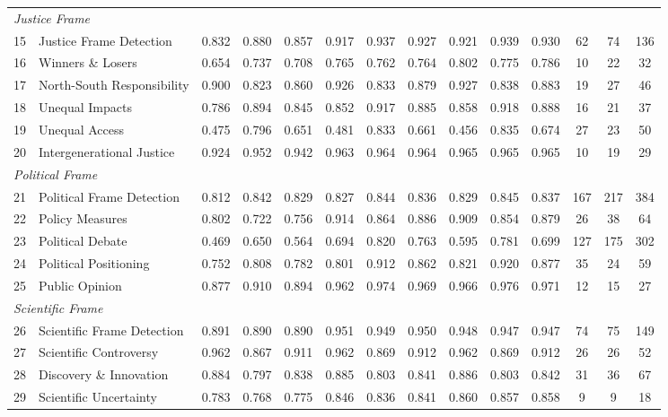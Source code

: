\documentclass[12pt]{article}
\begin{document}
{\begin{longtable}{p{0.4cm}p{5.5cm}cccccccccccc}
\multicolumn{14}{l}{\textit{Justice Frame}} \\
15 & Justice Frame Detection & 0.832 & 0.880 & 0.857 & 0.917 & 0.937 & 0.927 & 0.921 & 0.939 & 0.930 & 62 & 74 & 136 \\
16 & Winners \& Losers & 0.654 & 0.737 & 0.708 & 0.765 & 0.762 & 0.764 & 0.802 & 0.775 & 0.786 & 10 & 22 & 32 \\
17 & North-South Responsibility & 0.900 & 0.823 & 0.860 & 0.926 & 0.833 & 0.879 & 0.927 & 0.838 & 0.883 & 19 & 27 & 46 \\
18 & Unequal Impacts & 0.786 & 0.894 & 0.845 & 0.852 & 0.917 & 0.885 & 0.858 & 0.918 & 0.888 & 16 & 21 & 37 \\
19 & Unequal Access & 0.475 & 0.796 & 0.651 & 0.481 & 0.833 & 0.661 & 0.456 & 0.835 & 0.674 & 27 & 23 & 50 \\
20 & Intergenerational Justice & 0.924 & 0.952 & 0.942 & 0.963 & 0.964 & 0.964 & 0.965 & 0.965 & 0.965 & 10 & 19 & 29 \\
\midrule
\multicolumn{14}{l}{\textit{Political Frame}} \\
21 & Political Frame Detection & 0.812 & 0.842 & 0.829 & 0.827 & 0.844 & 0.836 & 0.829 & 0.845 & 0.837 & 167 & 217 & 384 \\
22 & Policy Measures & 0.802 & 0.722 & 0.756 & 0.914 & 0.864 & 0.886 & 0.909 & 0.854 & 0.879 & 26 & 38 & 64 \\
23 & Political Debate & 0.469 & 0.650 & 0.564 & 0.694 & 0.820 & 0.763 & 0.595 & 0.781 & 0.699 & 127 & 175 & 302 \\
24 & Political Positioning & 0.752 & 0.808 & 0.782 & 0.801 & 0.912 & 0.862 & 0.821 & 0.920 & 0.877 & 35 & 24 & 59 \\
25 & Public Opinion & 0.877 & 0.910 & 0.894 & 0.962 & 0.974 & 0.969 & 0.966 & 0.976 & 0.971 & 12 & 15 & 27 \\
\midrule
\multicolumn{14}{l}{\textit{Scientific Frame}} \\
26 & Scientific Frame Detection & 0.891 & 0.890 & 0.890 & 0.951 & 0.949 & 0.950 & 0.948 & 0.947 & 0.947 & 74 & 75 & 149 \\
27 & Scientific Controversy & 0.962 & 0.867 & 0.911 & 0.962 & 0.869 & 0.912 & 0.962 & 0.869 & 0.912 & 26 & 26 & 52 \\
28 & Discovery \& Innovation & 0.884 & 0.797 & 0.838 & 0.885 & 0.803 & 0.841 & 0.886 & 0.803 & 0.842 & 31 & 36 & 67 \\
29 & Scientific Uncertainty & 0.783 & 0.768 & 0.775 & 0.846 & 0.836 & 0.841 & 0.860 & 0.857 & 0.858 & 9 & 9 & 18 \\

\end{longtable}}
\end{document}
